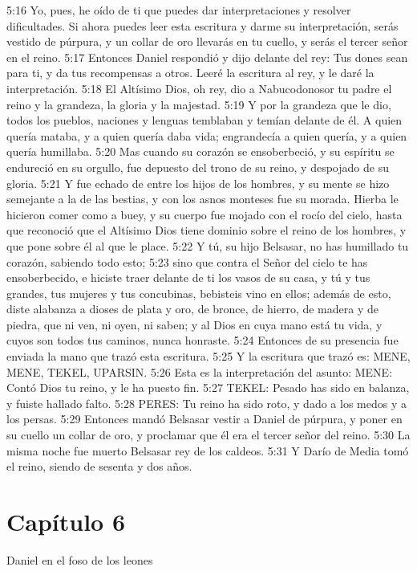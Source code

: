 5:16 Yo, pues, he oído de ti que puedes dar interpretaciones y resolver dificultades. Si ahora puedes leer esta escritura y darme su interpretación, serás vestido de púrpura, y un collar de oro llevarás en tu cuello, y serás el tercer señor en el reino. 
5:17 Entonces Daniel respondió y dijo delante del rey: Tus dones sean para ti, y da tus recompensas a otros. Leeré la escritura al rey, y le daré la interpretación. 
5:18 El Altísimo Dios, oh rey, dio a Nabucodonosor tu padre el reino y la grandeza, la gloria y la majestad. 
5:19 Y por la grandeza que le dio, todos los pueblos, naciones y lenguas temblaban y temían delante de él. A quien quería mataba, y a quien quería daba vida; engrandecía a quien quería, y a quien quería humillaba. 
5:20 Mas cuando su corazón se ensoberbeció, y su espíritu se endureció en su orgullo, fue depuesto del trono de su reino, y despojado de su gloria. 
5:21 Y fue echado de entre los hijos de los hombres, y su mente se hizo semejante a la de las bestias, y con los asnos monteses fue su morada. Hierba le hicieron comer como a buey, y su cuerpo fue mojado con el rocío del cielo, hasta que reconoció que el Altísimo Dios tiene dominio sobre el reino de los hombres, y que pone sobre él al que le place. 
5:22 Y tú, su hijo Belsasar, no has humillado tu corazón, sabiendo todo esto; 
5:23 sino que contra el Señor del cielo te has ensoberbecido, e hiciste traer delante de ti los vasos de su casa, y tú y tus grandes, tus mujeres y tus concubinas, bebisteis vino en ellos; además de esto, diste alabanza a dioses de plata y oro, de bronce, de hierro, de madera y de piedra, que ni ven, ni oyen, ni saben; y al Dios en cuya mano está tu vida, y cuyos son todos tus caminos, nunca honraste. 
5:24 Entonces de su presencia fue enviada la mano que trazó esta escritura. 
5:25 Y la escritura que trazó es: MENE, MENE, TEKEL, UPARSIN. 
5:26 Esta es la interpretación del asunto: MENE: Contó Dios tu reino, y le ha puesto fin. 
5:27 TEKEL: Pesado has sido en balanza, y fuiste hallado falto. 
5:28 PERES: Tu reino ha sido roto, y dado a los medos y a los persas. 
5:29 Entonces mandó Belsasar vestir a Daniel de púrpura, y poner en su cuello un collar de oro, y proclamar que él era el tercer señor del reino. 
5:30 La misma noche fue muerto Belsasar rey de los caldeos. 
5:31 Y Darío de Media tomó el reino, siendo de sesenta y dos años. 
\section*{Capítulo 6}
Daniel en el foso de los leones 
 
